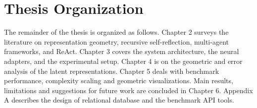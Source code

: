 \documentclass[a4paper, 12pt]{report}
\begin{document}
\section{Thesis Organization}
The remainder of the thesis is organized as follows. Chapter 2 surveys the literature on representation geometry, recursive self-reflection, multi-agent frameworks, and ReAct. Chapter 3 covers the system architecture, the neural adapters, and the experimental setup. Chapter 4 is on the geometric and error analysis of the latent representations. Chapter 5 deals with benchmark performance, complexity scaling and geometric visualizations. Main results, limitations and suggestions for future work are concluded in Chapter 6. Appendix A describes the design of relational database and the benchmark API tools.

\ifdefined\isincluded
\else
\end{document}
